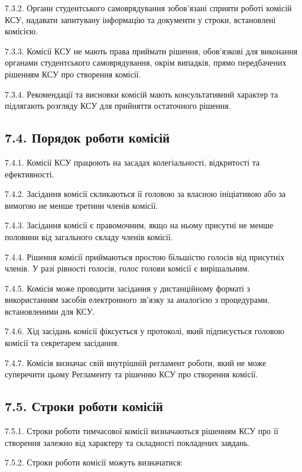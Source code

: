     7.3.2. Органи студентського самоврядування зобов'язані сприяти роботі комісій КСУ, надавати запитувану інформацію та документи у строки, встановлені комісією.

    7.3.3. Комісії КСУ не мають права приймати рішення, обов'язкові для виконання органами студентського самоврядування, окрім випадків, прямо передбачених рішенням КСУ про створення комісії.

    7.3.4. Рекомендації та висновки комісій мають консультативний характер та підлягають розгляду КСУ для прийняття остаточного рішення.

\subsection*{7.4. Порядок роботи комісій}
    7.4.1. Комісії КСУ працюють на засадах колегіальності, відкритості та ефективності.

    7.4.2. Засідання комісії скликаються її головою за власною ініціативою або за вимогою не менше третини членів комісії.

    7.4.3. Засідання комісії є правомочним, якщо на ньому присутні не менше половини від загального складу членів комісії.

    7.4.4. Рішення комісії приймаються простою більшістю голосів від присутніх членів. У разі рівності голосів, голос голови комісії є вирішальним.

    7.4.5. Комісія може проводити засідання у дистанційному форматі з використанням засобів електронного зв'язку за аналогією з процедурами, встановленими для КСУ.

    7.4.6. Хід засідань комісії фіксується у протоколі, який підписується головою комісії та секретарем засідання.

    7.4.7. Комісія визначає свій внутрішній регламент роботи, який не може суперечити цьому Регламенту та рішенню КСУ про створення комісії.

\subsection*{7.5. Строки роботи комісій}
    7.5.1. Строки роботи тимчасової комісії визначаються рішенням КСУ про її створення залежно від характеру та складності покладених завдань.

    7.5.2. Строки роботи комісії можуть визначатися:

